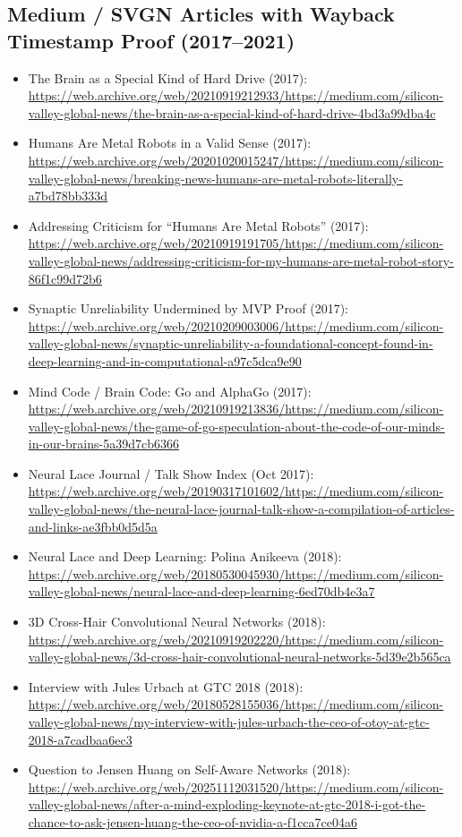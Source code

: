\documentclass[american,11pt,letterpaper]{article}
\def\emph#1{#1}%
\begin{document}
\subsection{Medium / SVGN Articles with Wayback Timestamp Proof (2017--2021)}
\begin{itemize}
  \item \emph{The Brain as a Special Kind of Hard Drive} (2017): \url{https://web.archive.org/web/20210919212933/https://medium.com/silicon-valley-global-news/the-brain-as-a-special-kind-of-hard-drive-4bd3a99dba4c}
  \item \emph{Humans Are Metal Robots in a Valid Sense} (2017): \url{https://web.archive.org/web/20201020015247/https://medium.com/silicon-valley-global-news/breaking-news-humans-are-metal-robots-literally-a7bd78bb333d}
  \item \emph{Addressing Criticism for ``Humans Are Metal Robots''} (2017): \url{https://web.archive.org/web/20210919191705/https://medium.com/silicon-valley-global-news/addressing-criticism-for-my-humans-are-metal-robot-story-86f1c99d72b6}
  \item \emph{Synaptic Unreliability Undermined by MVP Proof} (2017): \url{https://web.archive.org/web/20210209003006/https://medium.com/silicon-valley-global-news/synaptic-unreliability-a-foundational-concept-found-in-deep-learning-and-in-computational-a97c5dca9e90}
  \item \emph{Mind Code / Brain Code: Go and AlphaGo} (2017): \url{https://web.archive.org/web/20210919213836/https://medium.com/silicon-valley-global-news/the-game-of-go-speculation-about-the-code-of-our-minds-in-our-brains-5a39d7cb6366}
  \item \emph{Neural Lace Journal / Talk Show Index} (Oct 2017): \url{https://web.archive.org/web/20190317101602/https://medium.com/silicon-valley-global-news/the-neural-lace-journal-talk-show-a-compilation-of-articles-and-links-ae3fbb0d5d5a}
  \item \emph{Neural Lace and Deep Learning: Polina Anikeeva} (2018): \url{https://web.archive.org/web/20180530045930/https://medium.com/silicon-valley-global-news/neural-lace-and-deep-learning-6ed70db4e3a7}
  \item \emph{3D Cross-Hair Convolutional Neural Networks} (2018): \url{https://web.archive.org/web/20210919202220/https://medium.com/silicon-valley-global-news/3d-cross-hair-convolutional-neural-networks-5d39e2b565ca}
  \item \emph{Interview with Jules Urbach at GTC 2018} (2018): \url{https://web.archive.org/web/20180528155036/https://medium.com/silicon-valley-global-news/my-interview-with-jules-urbach-the-ceo-of-otoy-at-gtc-2018-a7cadbaa6ec3}
  \item \emph{Question to Jensen Huang on Self-Aware Networks} (2018): \url{https://web.archive.org/web/20251112031520/https://medium.com/silicon-valley-global-news/after-a-mind-exploding-keynote-at-gtc-2018-i-got-the-chance-to-ask-jensen-huang-the-ceo-of-nvidia-a-f1cca7ce04a6}
\end{itemize}
\end{document}
